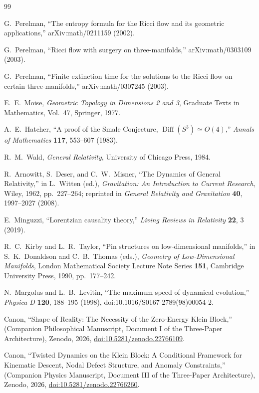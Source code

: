 \documentclass[11pt]{article}
\theoremstyle{canonmath}
\theoremstyle{canonpostulate}
\theoremstyle{canonproposition}
\providecommand{\Diff}{\operatorname{Diff}}
\newcommand{\CanonBibliographySetup}{%
  \small
  \setlength{\parskip}{0.22em}
  \setlength{\itemsep}{0.55em}
}
\begin{document}
{}
\begin{thebibliography}{99}
\CanonBibliographySetup

G.~Perelman, ``The entropy formula for the Ricci flow and its geometric applications,'' arXiv:math/0211159 (2002).

G.~Perelman, ``Ricci flow with surgery on three-manifolds,'' arXiv:math/0303109 (2003).

G.~Perelman, ``Finite extinction time for the solutions to the Ricci flow on certain three-manifolds,'' arXiv:math/0307245 (2003).

E.~E.~Moise, \textit{Geometric Topology in Dimensions 2 and 3}, Graduate Texts in Mathematics, Vol.~47, Springer, 1977.

A.~E.~Hatcher, ``A proof of the Smale Conjecture, $\Diff(S^3)\simeq O(4)$,'' \textit{Annals of Mathematics} \textbf{117}, 553--607 (1983).

R.~M.~Wald, \textit{General Relativity}, University of Chicago Press, 1984.

R.~Arnowitt, S.~Deser, and C.~W.~Misner, ``The Dynamics of General Relativity,'' in L.~Witten (ed.), \textit{Gravitation: An Introduction to Current Research}, Wiley, 1962, pp.~227--264; reprinted in \textit{General Relativity and Gravitation} \textbf{40}, 1997--2027 (2008).

E.~Minguzzi, ``Lorentzian causality theory,'' \textit{Living Reviews in Relativity} \textbf{22}, 3 (2019).

R.~C.~Kirby and L.~R.~Taylor, ``Pin structures on low-dimensional manifolds,'' in S.~K.~Donaldson and C.~B.~Thomas (eds.), \textit{Geometry of Low-Dimensional Manifolds}, London Mathematical Society Lecture Note Series \textbf{151}, Cambridge University Press, 1990, pp.~177--242.

N.~Margolus and L.~B.~Levitin, ``The maximum speed of dynamical evolution,'' \textit{Physica D} \textbf{120}, 188--195 (1998), doi:10.1016/S0167-2789(98)00054-2.

Canon, ``Shape of Reality: The Necessity of the Zero-Energy Klein Block,'' (Companion Philosophical Manuscript, Document I of the Three-Paper Architecture), Zenodo, 2026, \href{https://doi.org/10.5281/zenodo.22766109}{doi:10.5281/zenodo.22766109}.

Canon, ``Twisted Dynamics on the Klein Block: A Conditional Framework for Kinematic Descent, Nodal Defect Structure, and Anomaly Constraints,'' (Companion Physics Manuscript, Document III of the Three-Paper Architecture), Zenodo, 2026, \href{https://doi.org/10.5281/zenodo.22766260}{doi:10.5281/zenodo.22766260}.

\end{thebibliography}
\end{document}
